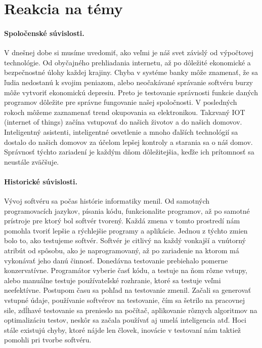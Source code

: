 \documentclass[10pt,twoside,slovak,a4paper]{article}
\begin{document}
\section{Reakcia na témy} \label{reakcie}
\paragraph{Spoločenské súvislosti.}
V dnešnej dobe si musíme uvedomiť, ako veľmi je náš svet závislý od výpočtovej technológie. Od obyčajného prehliadania internetu, až po dôležité ekonomické a bezpečnostné úlohy každej krajiny. Chyba v systéme banky môže znamenať, že sa ľudia nedostanú k svojim peniazom, alebo neočakávané správanie softvéru burzy môže vytvoriť ekonomickú depresiu. Preto je testovanie správnosti funkcie daných programov dôležite pre správne fungovanie  našej spoločnosti. V posledných rokoch môžeme zaznamenať trend okupovania sa elektronikou. Takzvaný IOT (internet of things) začína vstupovať do našich životov a do našich domovov. Inteligentný asistenti, inteligentné osvetlenie a mnoho ďalších technológií sa dostalo do našich domovov za účelom lepšej kontroly a starania sa o náš domov. Správnosť týchto zariadení je každým dňom dôležitejšia, keďže ich prítomnosť sa neustále zväčšuje.
\paragraph{Historické súvislosti.}
Vývoj softvéru sa počas histórie informatiky menil. Od samotných programovacích jazykov, písania kódu, funkcionalite programov, až po samotné prístroje pre ktorý bol softvér tvorený. Každá zmena v tomto prostredí nám pomohla tvoriť lepšie a rýchlejšie programy a aplikácie. Jednou z týchto zmien bolo to, ako testujeme softvér. Softvér je citlivý na každý vonkajší a vnútorný atribút od spôsobu, ako  je naprogramovaný, až po zariadenie na ktorom má vykonávať jeho danú činnosť. Donedávna testovanie prebiehalo pomerne konzervatívne. Programátor vyberie časť kódu, a testuje na ňom rôzne vstupy, alebo manuálne testuje používateľské rozhranie, ktoré sa testuje veľmi neefektívne. Postupom času sa pohľad na testovanie zmenil. Začali sa generovať vstupné údaje, používanie softvérov na testovanie, čím sa šetrilo na pracovnej sile, zdĺhavé testovanie sa prenieslo na počítač, aplikovanie rôznych algoritmov na optimalizáciu testov, neskôr sa začala používať aj umelá inteligencia atď. Hoci stále existujú chyby, ktoré nájde len človek, inovácie v testovaní nám taktiež pomohli pri tvorbe softvéru.
\end{document}
